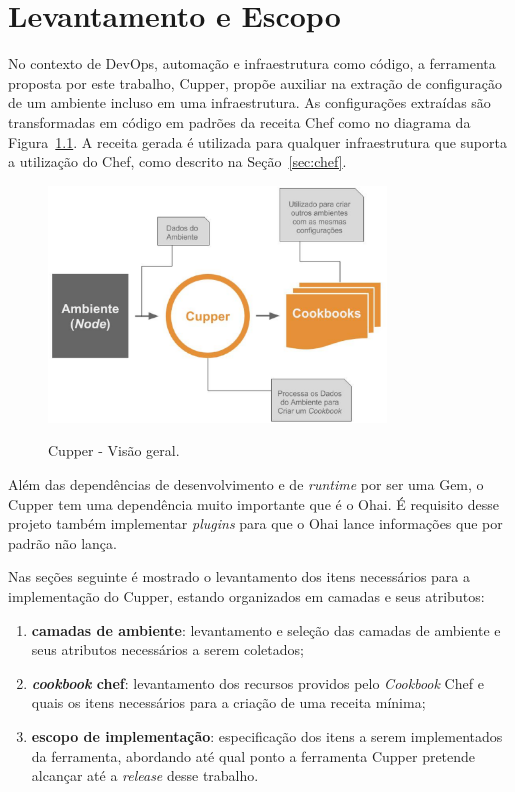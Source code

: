 \newpage\null\thispagestyle{empty}\newpage
\chapter{Levantamento e Escopo}
\label{chap:lev_es}

No contexto de DevOps, automação e infraestrutura como código, a ferramenta
proposta por este trabalho, Cupper, propõe auxiliar na extração de configuração
de um ambiente incluso em uma infraestrutura. As configurações extraídas são
transformadas em código em padrões da receita Chef como 
no diagrama da Figura~\ref{fig:cupper_geral}. A
receita gerada é utilizada para qualquer infraestrutura que suporta a
utilização do Chef, como descrito na Seção~\ref{sec:chef}.

\begin{figure}[]
  \centering
  \includegraphics[width=0.8\textwidth]{figuras/cupper_geral.eps}
  \label{fig:cupper_geral}
  \caption{Cupper - Visão geral.}
\end{figure}

Além das dependências de desenvolvimento e de \textit{runtime} por ser uma Gem,
o Cupper tem uma dependência muito
importante que é o Ohai. É requisito desse projeto também implementar
\textit{plugins} para que o Ohai lance informações que por padrão 
não lança.

Nas seções seguinte é mostrado o levantamento dos itens necessários para
a implementação do Cupper, estando organizados em camadas e seus atributos:

\begin{enumerate}
  \item \textbf{camadas de ambiente}: levantamento e seleção das camadas de ambiente
    e seus atributos necessários a serem coletados;
  \item \textbf{\textit{cookbook} chef}: levantamento dos recursos providos pelo \textit{Cookbook} Chef e quais os
    itens necessários para a criação de uma receita mínima;
  \item \textbf{escopo de implementação}: especificação dos itens a serem implementados
    da ferramenta, abordando até qual ponto a ferramenta Cupper pretende alcançar
    até a \textit{release} desse trabalho.
\end{enumerate}





